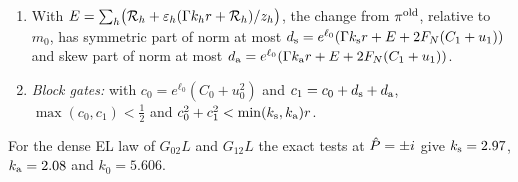 \begin{proposition}
\begin{enumerate}[label=(\alph*)]
 under the square-affine maps and supported where $K_1>0$; it accepts the required
 queries (for the dense EL law the twelve queries), and the record is replaced by
 its image under the emission.
\item With $E=\sum_h\bigl(\mathcal R_h+\varepsilon_h(\Gamma k_hr+\mathcal R_h)/z_h\bigr)$,
 the change from $\pi^{\rm old}$, relative to $m_0$, has symmetric part of norm
 at most $d_{\rm s}=e^{\ell_0}(\Gamma k_{\rm s}r+E+2F_N(C_1+u_1))$ and skew part of
 norm at most $d_{\rm a}=e^{\ell_0}(\Gamma k_{\rm a}r+E+2F_N(C_1+u_1))$.
\item \emph{Block gates:} with $c_0=e^{\ell_0}(C_0+u_0^2)$ and $c_1=c_0+d_{\rm s}+d_{\rm a}$,
 $\max(c_0,c_1)<\frac12$ and $c_0^2+c_1^2<\min(k_{\rm s},k_{\rm a})r$.
\end{enumerate}
For the dense EL law of $G_{02}L$ and $G_{12}L$ the exact tests at $\hat P=\pm i$
give $k_{\rm s}=2.97$, $k_{\rm a}=2.08$ and $k_0=5.606$.
\end{proposition}

